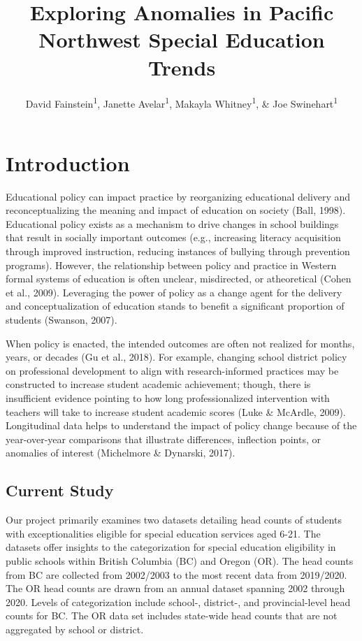 \documentclass[
  english,
  man]{apa6}
\title{Exploring Anomalies in Pacific Northwest Special Education Trends}
\author{David Fainstein\textsuperscript{1}, Janette Avelar\textsuperscript{1}, Makayla Whitney\textsuperscript{1}, \& Joe Swinehart\textsuperscript{1}}
\date{}
\affiliation{\vspace{0.5cm}\textsuperscript{1} University of Oregon}
\begin{document}
\maketitle

\hypertarget{introduction}{%
\section{Introduction}\label{introduction}}

Educational policy can impact practice by reorganizing educational delivery and reconceptualizing the meaning and impact of education on society (Ball, 1998). Educational policy exists as a mechanism to drive changes in school buildings that result in socially important outcomes (e.g., increasing literacy acquisition through improved instruction, reducing instances of bullying through prevention programs). However, the relationship between policy and practice in Western formal systems of education is often unclear, misdirected, or atheoretical (Cohen et al., 2009). Leveraging the power of policy as a change agent for the delivery and conceptualization of education stands to benefit a significant proportion of students (Swanson, 2007).

When policy is enacted, the intended outcomes are often not realized for months, years, or decades (Gu et al., 2018). For example, changing school district policy on professional development to align with research-informed practices may be constructed to increase student academic achievement; though, there is insufficient evidence pointing to how long professionalized intervention with teachers will take to increase student academic scores (Luke \& McArdle, 2009). Longitudinal data helps to understand the impact of policy change because of the year-over-year comparisons that illustrate differences, inflection points, or anomalies of interest (Michelmore \& Dynarski, 2017).

\hypertarget{current-study}{%
\subsection{Current Study}\label{current-study}}

Our project primarily examines two datasets detailing head counts of students with exceptionalities eligible for special education services aged 6-21. The datasets offer insights to the categorization for special education eligibility in public schools within British Columbia (BC) and Oregon (OR). The head counts from BC are collected from 2002/2003 to the most recent data from 2019/2020. The OR head counts are drawn from an annual dataset spanning 2002 through 2020. Levels of categorization include school-, district-, and provincial-level head counts for BC. The OR data set includes state-wide head counts that are not aggregated by school or district.
\end{document}
